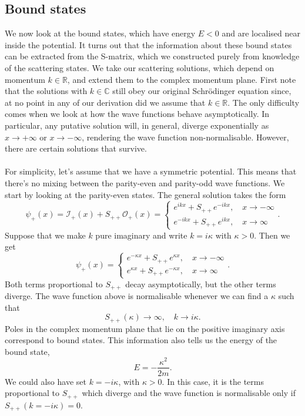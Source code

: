 \subsection{Bound states}
We now look at the bound states, which have energy $E < 0$ and are localised near inside the potential.
It turns out that the information about these bound states can be extracted from the S-matrix, which we constructed purely from knowledge of the scattering states. 
We take our scattering solutions, which depend on momentum $k \in  \mathbb{R}$, and extend them to the complex momentum plane. 
First note that the solutions with $k \in  \mathbb{C}$ still obey our original Schr\"{o}dinger equation since, at no point in any of our derivation did we assume that $k \in  \mathbb{R}$. 
The only difficulty comes when we look at how the wave functions behave asymptotically.
In particular, any putative solution will, in general, diverge exponentially as $x \to +\infty$ or $x \to -\infty$, rendering the wave function non-normalisable. However, there are certain solutions that survive.
\\ \\
For simplicity, let's assume that we have a symmetric potential. This means that there's no mixing between the parity-even and parity-odd wave functions. We start by looking at the parity-even states. The general solution takes the form
\[\psi_+(x) = \mathcal{I}_+(x) + S_{++}\mathcal{O}_+(x)  = \begin{cases} e^{ikx} + S_{++}e^{-ikx} , \quad x\to -\infty \\  e^{-ikx} + S_{++}e^{ikx} , \quad x\to \infty \end{cases} .\]
Suppose that we make $k$ pure imaginary and write $k = i\kappa$ with $\kappa > 0$. Then we get
\[\psi_+(x) = \begin{cases} e^{-\kappa x} + S_{++}e^{\kappa x} , \quad x\to -\infty \\  e^{\kappa x} + S_{++}e^{-\kappa x} , \quad x\to \infty \end{cases}.\]
Both terms proportional to $S_{++}$ decay asymptotically, but the other terms diverge.
The wave function above is normalisable whenever we can find a $\kappa$ such that
\[S_{++}(\kappa) \to \infty , \quad k \to i\kappa.\]
Poles in the complex momentum plane that lie on the positive imaginary axis correspond to bound states.
This information also tells us the energy of the bound state,
\[E = -\frac{\kappa^2}{2m}.\]
We could also have set $k = -i\kappa$, with $\kappa > 0$. In this case, it is the terms proportional to $S_{++}$ which diverge and the wave function is normalisable only if $S_{++}(k = -i\kappa) = 0$. 
